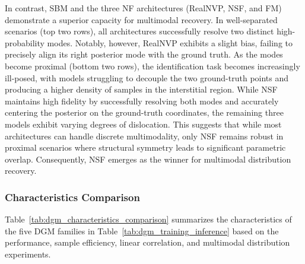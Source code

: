 In contrast, \ac{SBM} and the three \ac{NF} architectures (\ac{RealNVP}, \ac{NSF}, and \ac{FM}) demonstrate a superior capacity for multimodal recovery. In well-separated scenarios (top two rows), all architectures successfully resolve two distinct high-probability modes. Notably, however, \ac{RealNVP} exhibits a slight bias, failing to precisely align its right posterior mode with the ground truth. As the modes become proximal (bottom two rows), the identification task becomes increasingly ill-posed, with models struggling to decouple the two ground-truth points and producing a higher density of samples in the interstitial region. While \ac{NSF} maintains high fidelity by successfully resolving both modes and accurately centering the posterior on the ground-truth coordinates, the remaining three models exhibit varying degrees of dislocation. This suggests that while most architectures can handle discrete multimodality, only \ac{NSF} remains robust in proximal scenarios where structural symmetry leads to significant parametric overlap. Consequently, \ac{NSF} emerges as the winner for multimodal distribution recovery.

\subsubsection{Characteristics Comparison}
Table~\ref{tab:dgm_characteristics_comparison} summarizes the characteristics of the five \ac{DGM} families in Table~\ref{tab:dgm_training_inference} based on the performance, sample efficiency, linear correlation, and multimodal distribution experiments. 


